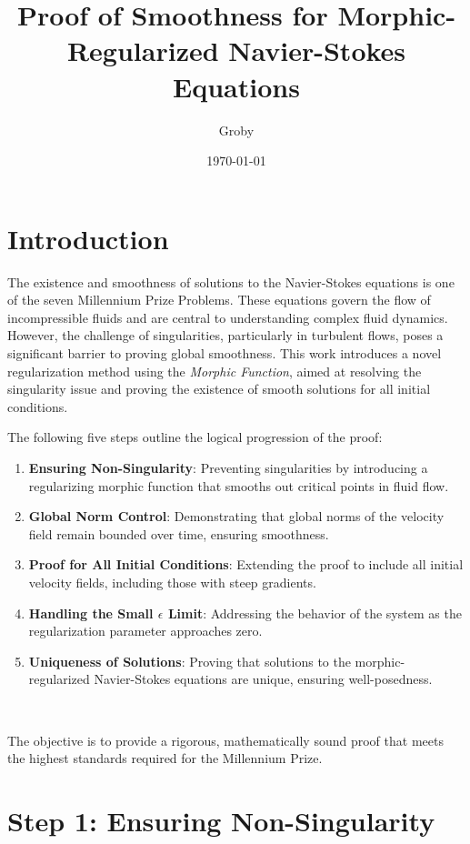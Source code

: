 \documentclass{article}
\title{Proof of Smoothness for Morphic-Regularized Navier-Stokes Equations}
\author{Groby}
\date{\today}
\begin{document}
\maketitle

\section*{Introduction}

The existence and smoothness of solutions to the Navier-Stokes equations is one of the seven Millennium Prize Problems. These equations govern the flow of incompressible fluids and are central to understanding complex fluid dynamics. However, the challenge of singularities, particularly in turbulent flows, poses a significant barrier to proving global smoothness. This work introduces a novel regularization method using the \textit{Morphic Function}, aimed at resolving the singularity issue and proving the existence of smooth solutions for all initial conditions.

The following five steps outline the logical progression of the proof:
\begin{enumerate}
    \item \textbf{Ensuring Non-Singularity}: Preventing singularities by introducing a regularizing morphic function that smooths out critical points in fluid flow.
    \item \textbf{Global Norm Control}: Demonstrating that global norms of the velocity field remain bounded over time, ensuring smoothness.
    \item \textbf{Proof for All Initial Conditions}: Extending the proof to include all initial velocity fields, including those with steep gradients.
    \item \textbf{Handling the Small \(\epsilon\) Limit}: Addressing the behavior of the system as the regularization parameter approaches zero.
    \item \textbf{Uniqueness of Solutions}: Proving that solutions to the morphic-regularized Navier-Stokes equations are unique, ensuring well-posedness.
\end{enumerate}
\

The objective is to provide a rigorous, mathematically sound proof that meets the highest standards required for the Millennium Prize.

\section*{Step 1: Ensuring Non-Singularity}
\end{document}
